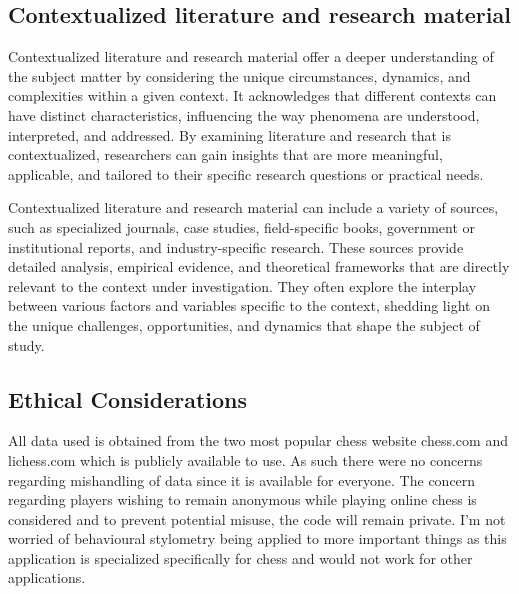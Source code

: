 \begin{spacing}{2.0}
\subsection{Contextualized literature and research material}

Contextualized literature and research material offer a deeper understanding of the subject matter by considering the unique circumstances, dynamics, and complexities within a given context. It acknowledges that different contexts can have distinct characteristics, influencing the way phenomena are understood, interpreted, and addressed. By examining literature and research that is contextualized, researchers can gain insights that are more meaningful, applicable, and tailored to their specific research questions or practical needs.

Contextualized literature and research material can include a variety of sources, such as specialized journals, case studies, field-specific books, government or institutional reports, and industry-specific research. These sources provide detailed analysis, empirical evidence, and theoretical frameworks that are directly relevant to the context under investigation. They often explore the interplay between various factors and variables specific to the context, shedding light on the unique challenges, opportunities, and dynamics that shape the subject of study.

\subsection{Ethical Considerations}

All data used is obtained from the two most popular chess website chess.com and lichess.com which is publicly available to use. As such there were no concerns regarding mishandling of data since it is available for everyone. The concern regarding players wishing to remain anonymous while playing online chess is considered and to prevent potential misuse, the code will remain private. I'm not worried of behavioural stylometry being applied to more important things as this application is specialized specifically for chess and would not work for other applications.

\end{spacing}
\newpage
